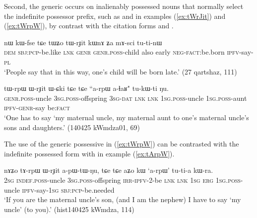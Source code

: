 Second, the generic  occurs on inalienably possessed nouns that normally select the  indefinite possessor prefix, such as  and  in examples (\ref{ex:tWrJit}) and (\ref{ex:tWrpW}), by contrast with the citation forms   and .

\begin{exe}
\ex \label{ex:tWrJit}
\gll nɯ 	kɯ-fse 	tɕe 	tɯʑo 	tɯ-rɟit 	kɯnɤ 	ʑa 	mɤ-sci 	tu-ti-nɯ \\
\textsc{dem} \textsc{sbj}:\textsc{pcp}-be.like \textsc{lnk} \textsc{genr} \textsc{genr}.\textsc{poss}-child also early \textsc{neg}-\textsc{fact}:be.born \textsc{ipfv}-say-\textsc{pl} \\
\glt `People say that in this way, one's child will be born late.' (27 qartshaz, 111)
\end{exe}

\begin{exe}
\ex \label{ex:tWrpW}
\gll  tɯ-rpɯ 	ɯ-rɟit 	ɯ-ɕki 	tɕe 	tɕe 	``a-rpɯ a-ɬaʁ" 	tu-kɯ-ti 	ŋu. \\
\textsc{genr}.\textsc{poss}-uncle \textsc{3sg}.\textsc{poss}-offspring \textsc{3sg}-\textsc{dat} \textsc{lnk} \textsc{lnk} \textsc{1sg}.\textsc{poss}-uncle \textsc{1sg}.\textsc{poss}-aunt \textsc{ipfv}-\textsc{genr}-say  be:\textsc{fact} \\
\glt `One has to say `my maternal uncle, my maternal aunt to one's maternal uncle's sons and daughters.' (140425 kWmdza01, 69)
\end{exe}

The use of the generic possessive  in (\ref{ex:tWrpW}) can be contrasted with the indefinite possessed form with  in example (\ref{ex:tArpW}).

\begin{exe}
\ex  \label{ex:tArpW}
\gll
nɤʑo 	tɤ-rpɯ 	ɯ-rɟit 	a-pɯ-tɯ-ŋu, 	tɕe 	tɕe 	aʑo 	kɯ 	`a-rpɯ' 	tu-ti-a 	kɯ-ra.  \\
\textsc{2sg} \textsc{indef}.\textsc{poss}-uncle \textsc{3sg}.\textsc{poss}-offspring \textsc{irr}-\textsc{ipfv}-2-be \textsc{lnk} \textsc{lnk} \textsc{1sg} \textsc{erg}  \textsc{1sg}.\textsc{poss}-uncle \textsc{ipfv}-say-\textsc{1sg} \textsc{sbj}:\textsc{pcp}-be.needed  \\
\glt `If you are the maternal uncle's son, (and I am the nephew) I have to say `my uncle' (to you).'  (hist140425 kWmdza, 114)
\end{exe}

